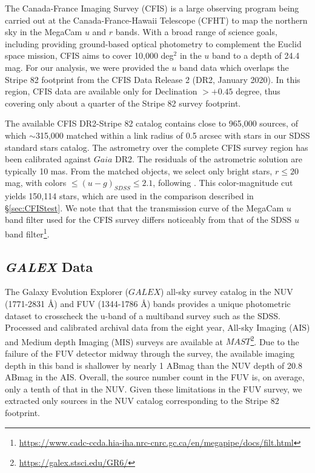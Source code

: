 \documentclass[fleqn,usenatbib]{mnras}
\begin{document}
The Canada-France Imaging Survey (CFIS) \citep{2017ApJ...848..128I} is a large observing program being carried out at the Canada-France-Hawaii Telescope (CFHT) to map the northern sky in the MegaCam $u$ and $r$ bands. With a broad range of science goals, including providing ground-based optical photometry to complement the Euclid space mission, CFIS aims to cover 10,000 deg$^2$ in the $u$ band to a depth of 24.4 mag. For our analysis, we were provided the $u$ band data which 
overlaps the Stripe 82 footprint from the CFIS Data Release 2 (DR2, January 2020). In this region, CFIS data are available
only for Declination $>+0.45$ degree, thus covering only about a quarter of the Stripe 82 survey footprint. 

The available CFIS DR2-Stripe 82 catalog contains close to 965,000 sources, of which $\sim$315,000 matched within 
a link radius of 0.5 arcsec with stars in our SDSS standard stars catalog. The astrometry over the complete CFIS survey 
region has been calibrated against $Gaia$ DR2.  The residuals of the astrometric solution are typically 10 mas.  From the matched objects, we select only bright stars, $r \leq 20$ mag,  with colors  $\leq (u-g)_{SDSS} \leq 2.1$, following \cite{2017ApJ...848..128I}. This color-magnitude cut yields 150,114 stars, which are used in the comparison described in \S \ref{sec:CFIStest}.  We note that that the transmission curve of the MegaCam $u$ band filter used for the CFIS survey differs noticeably from that of the SDSS $u$ band filter\footnote{\url{https://www.cadc-ccda.hia-iha.nrc-cnrc.gc.ca/en/megapipe/docs/filt.html}}.



\subsection{{\it GALEX} Data} \label{ssec:galex}

The Galaxy Evolution Explorer ($GALEX$) all-sky survey catalog in the NUV (1771-2831 \AA) and FUV (1344-1786 \AA) bands provides a unique photometric dataset to crosscheck the u-band of a multiband survey such as the SDSS. Processed and calibrated archival data from the eight year, All-sky Imaging (AIS) and Medium depth Imaging (MIS) surveys are available at $MAST$\footnote{\url{https://galex.stsci.edu/GR6/}}. Due to the failure of the FUV detector midway through the survey, the available imaging depth in this band is shallower by nearly 1 ABmag than the NUV depth of 20.8 ABmag in the AIS. Overall, the source number count in the FUV is, on average, only a tenth of that in the NUV. Given these limitations in the FUV survey, we extracted only sources in the NUV catalog corresponding to the Stripe 82 footprint.  
 
\end{document}
